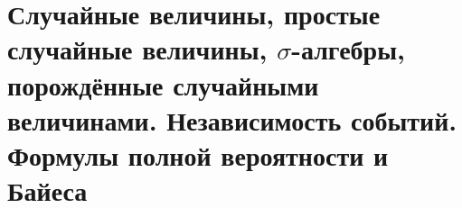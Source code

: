 \section{Случайные величины, простые случайные величины, $\sigma$-алгебры, порождённые случайными величинами. Независимость событий. Формулы полной вероятности и Байеса}



